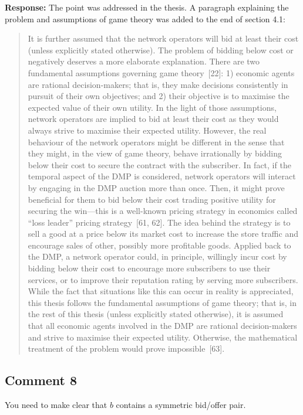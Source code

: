 \documentclass[10pt,a4paper,notitlepage]{article}
\numberwithin{equation}{section}
\begin{document}
\textbf{Response:}
The point was addressed in the thesis. A paragraph explaining the problem and assumptions of game theory was added to the end of section 4.1:
\begin{quote}
It is further assumed that the network operators will bid at least their cost (unless explicitly stated otherwise). The problem of bidding below cost or negatively deserves a more elaborate explanation. There are two fundamental assumptions governing game theory~[22]: 1) economic agents are rational decision-makers; that is, they make decisions consistently in pursuit of their own objectives; and 2) their objective is to maximise the expected value of their own utility. In the light of those assumptions, network operators are implied to bid at least their cost as they would always strive to maximise their expected utility. However, the real behaviour of the network operators might be different in the sense that they might, in the view of game theory, behave irrationally by bidding below their cost to secure the contract with the subscriber. In fact, if the temporal aspect of the DMP is considered, network operators will interact by engaging in the DMP auction more than once. Then, it might prove beneficial for them to bid below their cost trading positive utility for securing the win---this is a well-known pricing strategy in economics called ``loss leader'' pricing strategy~[61, 62]. The idea behind the strategy is to sell a good at a price below its market cost to increase the store traffic and encourage sales of other, possibly more profitable goods. Applied back to the DMP, a network operator could, in principle, willingly incur cost by bidding below their cost to encourage more subscribers to use their services, or to improve their reputation rating by serving more subscribers. While the fact that situations like this can occur in reality is appreciated, this thesis follows the fundamental assumptions of game theory; that is, in the rest of this thesis (unless explicitly stated otherwise), it is assumed that all economic agents involved in the DMP are rational decision-makers and strive to maximise their expected utility. Otherwise, the mathematical treatment of the problem would prove impossible~[63].
\end{quote}

\subsection{Comment 8}
You need to make clear that $b$ contains a symmetric bid/offer pair.
\end{document}
